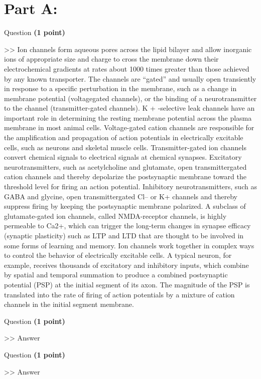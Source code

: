 \documentclass[12pt,a4paper]{article}
\begin{document}
\section*{Part A: }
\begin{enumerate}[font=\bfseries, wide]
    {\color{under}\item Question \textbf{(1 point)}}\par
    >> Ion channels form aqueous pores across the lipid bilayer and allow inorganic ions of appropriate size and charge to cross the membrane down their electrochemical gradients at rates about 1000 times greater than those achieved by any known transporter. The channels are “gated” and usually open transiently in response to a specific perturbation in the membrane, such as a change in membrane potential (voltagegated channels), or the binding of a neurotransmitter to the channel (transmitter-gated channels). K + -selective leak channels have an important role in determining the resting membrane potential across the plasma membrane in most animal cells. Voltage-gated cation channels are responsible for the amplification and propagation of action potentials in electrically excitable cells, such as neurons and skeletal muscle cells. Transmitter-gated ion channels convert chemical signals to electrical signals at chemical synapses. Excitatory neurotransmitters, such as acetylcholine and glutamate, open transmittergated cation channels and thereby depolarize the postsynaptic membrane toward the threshold level for firing an action potential. Inhibitory neurotransmitters, such as GABA and glycine, open transmittergated Cl– or K+ channels and thereby suppress firing by keeping the postsynaptic membrane polarized. A subclass of glutamate-gated ion channels, called NMDA-receptor channels, is highly permeable to Ca2+, which can trigger the long-term changes in synapse efficacy (synaptic plasticity) such as LTP and LTD that are thought to be involved in some forms of learning and memory. Ion channels work together in complex ways to control the behavior of electrically excitable cells. A typical neuron, for example, receives thousands of excitatory and inhibitory inputs, which combine by spatial and temporal summation to produce a combined postsynaptic potential (PSP) at the initial segment of its axon. The magnitude of the PSP is translated into the rate of firing of action potentials by a mixture of cation channels in the initial segment membrane.
    {\color{under}\item Question \textbf{(1 point)}}\par
    >> Answer
    {\color{under}\item Question \textbf{(1 point)}}\par
    >> Answer
\end{enumerate}
\end{document}

